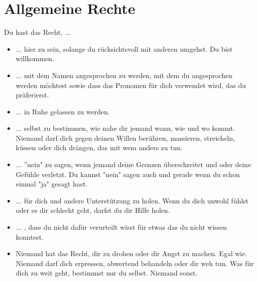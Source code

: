\documentclass{article}
\begin{document}
\section{Allgemeine Rechte}
Du hast das Recht, ...
\begin{itemize}
    \item 	... hier zu sein, solange du rücksichtsvoll mit anderen umgehst. Du bist willkommen.

    \item   ... mit dem Namen angesprochen zu werden, mit dem du angesprochen werden möchtest sowie dass das Pronomen für dich verwendet wird, das du präferierst.

    \item 	... in Ruhe gelassen zu werden.

    \item 	... selbst zu bestimmen, wie nahe dir jemand wann, wie und wo kommt. Niemand darf dich gegen deinen Willen berühren, massieren, streicheln, küssen oder dich drängen, das mit wem anders zu tun.

    \item 	... ''nein" zu sagen, wenn jemand deine Grenzen überschreitet und oder deine Gefühle verletzt. Du kannst "nein" sagen auch und gerade wenn du schon einmal "ja" gesagt hast.

    \item 	... für dich und andere Unterstützung zu holen. Wenn du dich unwohl fühlst oder es dir schlecht geht, darfst du dir Hilfe holen.

    \item 	... , dass du nicht dafür verurteilt wirst für etwas das du nicht wissen konntest.

    \item 	Niemand hat das Recht, dir zu drohen oder dir Angst zu machen. Egal wie. Niemand darf dich erpressen, abwertend behandeln oder dir weh tun. Was für dich zu weit geht, bestimmst nur du selbst. Niemand sonst.

\end{itemize}
\end{document}
